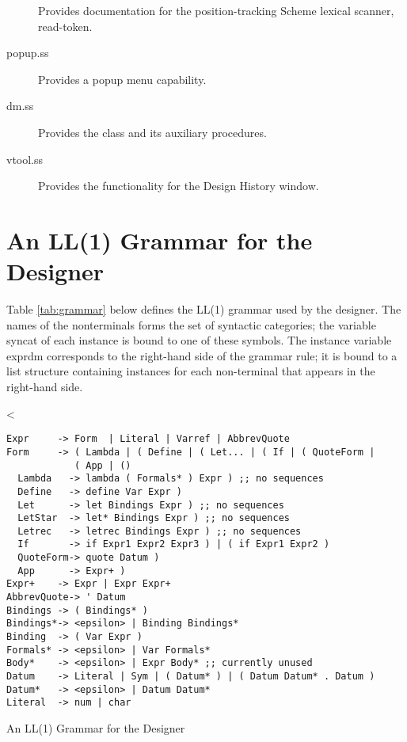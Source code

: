 \documentclass{article}
\begin{document}
\begin{description}
Provides documentation for the position-tracking Scheme lexical
scanner, {\sf read-token}.


\item[popup.ss]

Provides a popup menu capability.


\item[dm.ss]

Provides the  class and its auxiliary procedures.

\item[vtool.ss]

Provides the functionality for the Design History window.

\end{description}





\section{An LL(1) Grammar for the Designer}

Table \ref{tab:grammar} below defines the LL(1) grammar used by the
designer.  The names of the nonterminals forms the set of syntactic
categories; the variable {\sf syncat} of each 
instance is bound to one of these symbols. The instance variable {\sf
exprdm} corresponds to the right-hand side of the grammar rule; it is
bound to a list structure containing  instances
for each non-terminal that appears in the right-hand side.


\begin{table}\centering
<
\begin{verbatim}
Expr     -> Form  | Literal | Varref | AbbrevQuote
Form     -> ( Lambda | ( Define | ( Let... | ( If | ( QuoteForm | 
            ( App | ()
  Lambda   -> lambda ( Formals* ) Expr ) ;; no sequences
  Define   -> define Var Expr )
  Let      -> let Bindings Expr ) ;; no sequences
  LetStar  -> let* Bindings Expr ) ;; no sequences
  Letrec   -> letrec Bindings Expr ) ;; no sequences
  If       -> if Expr1 Expr2 Expr3 ) | ( if Expr1 Expr2 )
  QuoteForm-> quote Datum )
  App      -> Expr+ )
Expr+    -> Expr | Expr Expr+    
AbbrevQuote-> ' Datum
Bindings -> ( Bindings* )
Bindings*-> <epsilon> | Binding Bindings*
Binding  -> ( Var Expr )
Formals* -> <epsilon> | Var Formals*
Body*    -> <epsilon> | Expr Body* ;; currently unused
Datum    -> Literal | Sym | ( Datum* ) | ( Datum Datum* . Datum )
Datum*   -> <epsilon> | Datum Datum*
Literal  -> num | char 
\end{verbatim}

\caption{An LL(1) Grammar for the Designer}\label{tab:grammar}
\end{table}
\end{document}

